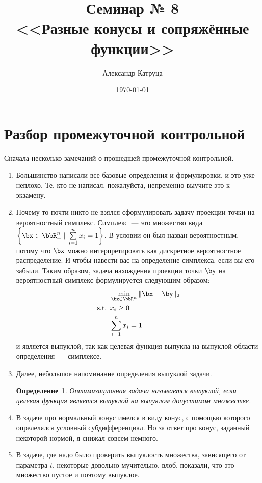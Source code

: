 \documentclass[12pt]{article}
\newtheorem{Def}{ Определение}
\begin{document}
\title{Семинар № 8 \\ 
<<Разные конусы и сопряжённые функции>>}
\author{Александр Катруца}
\date{\today}
\maketitle

\section{Разбор промежуточной контрольной}
Сначала несколько замечаний о прошедшей промежуточной контрольной.
\begin{enumerate}
\item Большинство написали все базовые определения и формулировки, и это уже неплохо. 
Те, кто не написал, пожалуйста, непременно выучите это к экзамену.
\item Почему-то почти никто не взялся сформулировать задачу проекции точки на вероятностный симплекс. 
Симплекс~--- это множество вида $\left \{ \bx \in \bbR_+^n \; | \; \sum\limits_{i=1}^n x_i = 1 \right \}$.
В условии он был назван вероятностным, потому что $\bx$ можно интерпретировать как дискретное вероятностное распределение.
И чтобы навести вас на определение симплекса, если вы его забыли.
Таким образом, задача нахождения проекции точки $\by$ на вероятностный симплекс формулируется следующим образом:
\begin{equation}
\begin{split}
&\min\limits_{\bx \in \bbR^n} \| \bx - \by \|_2\\
\text{s.t. } & x_i \geq 0\\
& \sum\limits_{i=1}^n x_i = 1
\end{split}
\end{equation}
и является выпуклой, так как целевая функция выпукла на выпуклой области определения~--- симплексе.
\item Далее, небольшое напоминание определения выпуклой задачи. 
\begin{Def}
Оптимизационная задача называется \emph{выпуклой}, если целевая функция является выпуклой на выпуклом допустимом множестве.
\end{Def}
\item В задаче про нормальный конус имелся в виду конус, с помощью которого опрелелялся условный субдифференциал. 
Но за ответ про конус, заданный некоторой нормой, я снижал совсем немного.
\item В задаче, где надо было проверить выпуклость множества, зависящего от параметра $t$, некоторые довольно мучительно, влоб, показали, что это множество пустое и поэтому выпуклое.

\end{enumerate}
\end{document}
